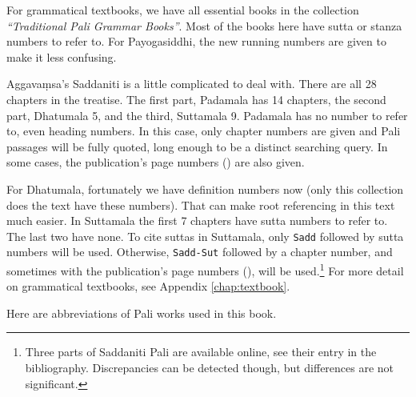 For grammatical textbooks, we have all essential books in the collection \emph{``Traditional P\a{=}ali Grammar Books''}. Most of the books here have sutta or stanza numbers to refer to. For Payogasiddhi, the new running numbers are given to make it less confusing.

Aggava\d msa's Saddan\a{=}iti is a little complicated to deal with. There are all 28 chapters in the treatise. The first part, Padam\a{=}al\a{=}a has 14 chapters, the second part, Dh\a{=}atum\a{=}al\a{=}a 5, and the third, Suttam\a{=}al\a{=}a 9. Padam\a{=}al\a{=}a has no number to refer to, even heading numbers. In this case, only chapter numbers are given and P\a{=}ali passages will be fully quoted, long enough to be a distinct searching query. In some cases, the publication's page numbers (\citealp{smith:sadd1}) are also given.

For Dh\a{=}atum\a{=}al\a{=}a, fortunately we have definition numbers now (only this collection does the text have these numbers). That can make root referencing in this text much easier. In Suttam\a{=}al\a{=}a the first 7 chapters have sutta numbers to refer to. The last two have none. To cite suttas in Suttam\a{=}al\a{=}a, only \texttt{Sadd} followed by sutta numbers will be used. Otherwise, \texttt{Sadd-Sut} followed by a chapter number, and sometimes with the publication's page numbers (\citealp{smith:sadd3}), will be used.\footnote{Three parts of Saddan\a{=}iti P\a{=}ali are available online, see their entry in the bibliography. Discrepancies can be detected though, but differences are not significant.} For more detail on grammatical textbooks, see Appendix \ref{chap:textbook}.

Here are abbreviations of P\a{=}ali works used in this book.

